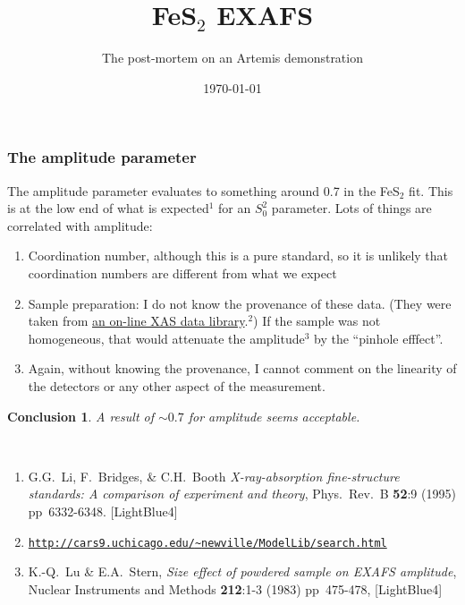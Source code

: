 \documentclass[10pt, xcolor=x11names, compress, handout]{beamer}
\title{FeS$_2$ EXAFS}%
\subtitle{The post-mortem on an Artemis demonstration}
\date{\today}
\newcommand{\fes}{FeS$_2$}
\newtheorem{conclusion}[theorem]{Conclusion}
\begin{document}
\maketitle


\begin{frame}
  \frametitle{The amplitude parameter}
  \small%
  The amplitude parameter evaluates to something around 0.7 in the
  {\fes} fit.  This is at the low end of what is expected$^1$ for an
  $S_0^2$ parameter.  Lots of things are correlated with amplitude:
  \begin{enumerate}
  \item Coordination number, although this is a pure standard, so it
    is unlikely that coordination numbers are different from what we
    expect
  \item Sample preparation: I do not know the provenance of these
    data.  (They were taken from
    \href{http://cars9.uchicago.edu/~newville/ModelLib/search.html}
    {\color{Blue4}an on-line XAS data library}.$^2$) If the sample was
    not homogeneous, that would attenuate the amplitude$^3$ by the
    ``pinhole efffect''.
  \item Again, without knowing the provenance, I cannot comment on the
    linearity of the detectors or any other aspect of the measurement.
  \end{enumerate}

  \begin{conclusion}
    A result of $\sim0.7$ for amplitude seems acceptable.
  \end{conclusion}

  \medskip

  ~

  \begin{bottomnote}[0.9][16.5]%
    \begin{enumerate}[1.]
    \tiny
    \item G.G.\ Li, F.\ Bridges, \& C.H.\ Booth \textit{X-ray-absorption
        fine-structure standards: A comparison of experiment and
        theory}, Phys.\ Rev.\ B \textbf{52}:9 (1995) pp\ 6332-6348.
      [LightBlue4]
    \item \href{http://cars9.uchicago.edu/~newville/ModelLib/search.html}
      {\color{LightBlue4}{\ComputerMouse~}\texttt{http://cars9.uchicago.edu/{\textasciitilde}newville/ModelLib/search.html}}
    \item K.-Q.\ Lu \& E.A.\ Stern, \textit{Size effect of powdered
        sample on EXAFS amplitude}, Nuclear Instruments and Methods
      \textbf{212}:1-3 (1983) pp\ 475-478, 
      [LightBlue4]
    \end{enumerate}
  \end{bottomnote}

\end{frame}
\end{document}
